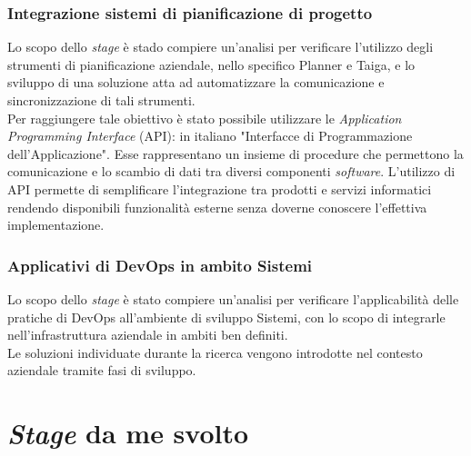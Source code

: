\subsubsection*{Integrazione sistemi di pianificazione di progetto}
\label{stageGiacomo}
Lo scopo dello \emph{stage} è stado compiere un'analisi per verificare l'utilizzo degli strumenti di pianificazione aziendale, nello specifico Planner e Taiga, e lo sviluppo di una soluzione atta ad automatizzare la comunicazione e sincronizzazione di tali strumenti.\\
Per raggiungere tale obiettivo è stato possibile utilizzare le \emph{Application Programming Interface} (API): in italiano "Interfacce di Programmazione dell'Applicazione". Esse rappresentano un insieme di procedure che permettono la comunicazione e lo scambio di dati tra diversi componenti \emph{software}. L'utilizzo di API permette di semplificare l'integrazione tra prodotti e servizi informatici rendendo disponibili funzionalità esterne senza doverne conoscere l'effettiva implementazione.

\subsubsection*{Applicativi di DevOps in ambito Sistemi}
\label{stageDavide}
Lo scopo dello \emph{stage} è stato compiere un'analisi per verificare l'applicabilità delle pratiche di \gls{DevOps} all'ambiente di sviluppo \gls{Sistemi}, con lo scopo di integrarle nell'infrastruttura aziendale in ambiti ben definiti.\\
Le soluzioni individuate durante la ricerca vengono introdotte nel contesto aziendale tramite fasi di sviluppo. 


\section{\emph{Stage} da me svolto}
